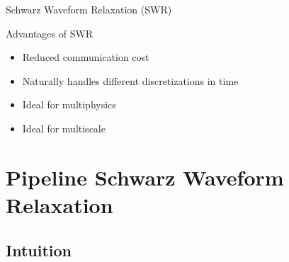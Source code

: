 \documentclass[]{beamer}
\begin{document}


\begin{frame}{Schwarz Waveform Relaxation (SWR)}

  Advantages of SWR
  \begin{itemize}
  \item Reduced communication cost
  \item Naturally handles different discretizations in time
  \item Ideal for multiphysics
  \item Ideal for multiscale
  \end{itemize}

\end{frame}



\section{Pipeline Schwarz Waveform Relaxation}

\subsection{Intuition}
\end{document}
